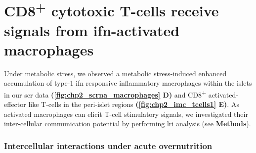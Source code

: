 
\section[CD8\textsuperscript{+} cytotoxic T-cells receive signals from \glsentryshort{ifn}-activated macrophages]{CD8\textsuperscript{+} cytotoxic T-cells receive signals from \gls{ifn}-activated\\macrophages}
\label{sec:chp2_cell_cell}

Under metabolic stress, we observed a metabolic stress-induced enhanced accumulation of type-1 \gls{ifn} responsive inflammatory macrophages within the islets in our \gls{scr} data \textbf{(\autoref{fig:chp2_scrna_macrophages} D)} and CD8\textsuperscript{+} activated-effector like T-cells in the peri-islet regions \textbf{(\autoref{fig:chp2_imc_tcells1} E)}. As activated macrophages can elicit T-cell stimulatory signals, we investigated their inter-cellular communication potential by performing \gls{lri} analysis (see \hyperref[subsubsec:met_chp2_cellcell]{\textbf{Methods}}).

\subsubsection{\large Intercellular interactions under acute overnutrition}


